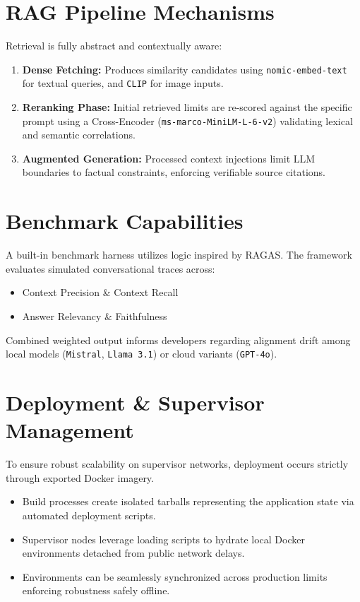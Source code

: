 \documentclass[12pt,a4paper]{article}
\begin{document}
\section{RAG Pipeline Mechanisms}
Retrieval is fully abstract and contextually aware:
\begin{enumerate}
    \item \textbf{Dense Fetching:} Produces similarity candidates using \texttt{nomic-embed-text} for textual queries, and \texttt{CLIP} for image inputs.
    \item \textbf{Reranking Phase:} Initial retrieved limits are re-scored against the specific prompt using a Cross-Encoder (\texttt{ms-marco-MiniLM-L-6-v2}) validating lexical and semantic correlations.
    \item \textbf{Augmented Generation:} Processed context injections limit LLM boundaries to factual constraints, enforcing verifiable source citations.
\end{enumerate}

\section{Benchmark Capabilities}
A built-in benchmark harness utilizes logic inspired by RAGAS. The framework evaluates simulated conversational traces across:
\begin{itemize}
    \item Context Precision \& Context Recall
    \item Answer Relevancy \& Faithfulness
\end{itemize}
Combined weighted output informs developers regarding alignment drift among local models (\texttt{Mistral}, \texttt{Llama 3.1}) or cloud variants (\texttt{GPT-4o}).

\section{Deployment \& Supervisor Management}
To ensure robust scalability on supervisor networks, deployment occurs strictly through exported Docker imagery. 
\begin{itemize}
    \item Build processes create isolated tarballs representing the application state via automated deployment scripts.
    \item Supervisor nodes leverage loading scripts to hydrate local Docker environments detached from public network delays.
    \item Environments can be seamlessly synchronized across production limits enforcing robustness safely offline.
\end{itemize}
\end{document}
